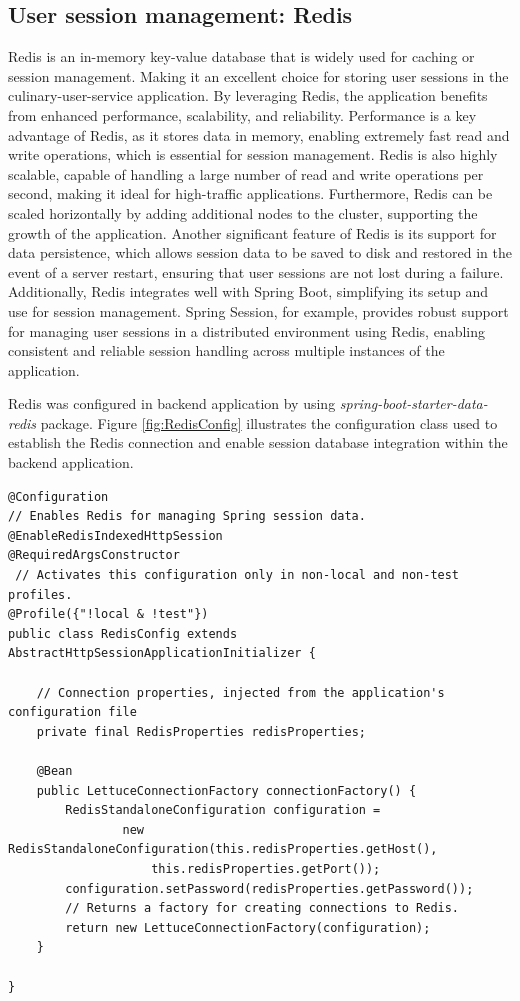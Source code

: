 \subsection{User session management: Redis}

Redis \cite{redis} is an in-memory key-value database that is widely used for caching or session management. Making it an excellent choice for storing user sessions in the culinary-user-service application. By leveraging Redis, the application benefits from enhanced performance, scalability, and reliability. Performance is a key advantage of Redis, as it stores data in memory, enabling extremely fast read and write operations, which is essential for session management. Redis is also highly scalable, capable of handling a large number of read and write operations per second, making it ideal for high-traffic applications. Furthermore, Redis can be scaled horizontally by adding additional nodes to the cluster, supporting the growth of the application. Another significant feature of Redis is its support for data persistence, which allows session data to be saved to disk and restored in the event of a server restart, ensuring that user sessions are not lost during a failure. Additionally, Redis integrates well with Spring Boot, simplifying its setup and use for session management. Spring Session, for example, provides robust support for managing user sessions in a distributed environment using Redis, enabling consistent and reliable session handling across multiple instances of the application.

Redis was configured in backend application by using \textit{spring-boot-starter-data-redis} package. Figure \ref{fig:RedisConfig} illustrates the configuration class used to establish the Redis connection and enable session database integration within the backend application.
\renewcommand\theFancyVerbLine{\large\arabic{FancyVerbLine}}
{
\begin{verbatim}
@Configuration
// Enables Redis for managing Spring session data.
@EnableRedisIndexedHttpSession  
@RequiredArgsConstructor
 // Activates this configuration only in non-local and non-test profiles.
@Profile({"!local & !test"})
public class RedisConfig extends AbstractHttpSessionApplicationInitializer {

    // Connection properties, injected from the application's configuration file
    private final RedisProperties redisProperties;

    @Bean
    public LettuceConnectionFactory connectionFactory() {
        RedisStandaloneConfiguration configuration =
                new RedisStandaloneConfiguration(this.redisProperties.getHost(),
                    this.redisProperties.getPort());
        configuration.setPassword(redisProperties.getPassword());
        // Returns a factory for creating connections to Redis.
        return new LettuceConnectionFactory(configuration);
    }

}
\end{verbatim}
\label{fig:RedisConfig}
}


